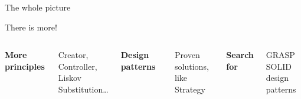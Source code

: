 \begin{frame}{The whole picture}


\end{frame}




\begin{frame}{There is more!}

    \vfill

    \begin{columns}[T]
        \centering
        {\Large\bfseries\textcolor{talkaccent}{More principles}}\par
        \vspace{0.6em}
        {\small\textcolor{talkdim}{Creator, Controller,\\Liskov Substitution\ldots}}

        \centering
        {\Large\bfseries\textcolor{talkaccent}{Design patterns}}\par
        \vspace{0.6em}
        {\small\textcolor{talkdim}{Proven solutions,\\like Strategy}}

        \centering
        {\Large\bfseries\textcolor{talkaccent}{Search for}}\par
        \vspace{0.6em}
        {\small\textcolor{talkdim}{GRASP \textperiodcentered{} SOLID\\design patterns}}
    \end{columns}

    \vfill
    \pause

\end{frame}

